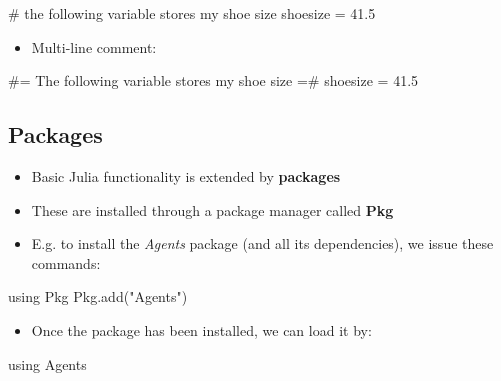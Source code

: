 \documentclass[
  letterpaper,
  DIV=11,
  numbers=noendperiod]{scrartcl}
\newenvironment{Shaded}{\begin{snugshade}}{\end{snugshade}}
\newcommand{\BuiltInTok}[1]{\textcolor[rgb]{0.00,0.23,0.31}{#1}}
\newcommand{\CommentTok}[1]{\textcolor[rgb]{0.37,0.37,0.37}{#1}}
\newcommand{\FloatTok}[1]{\textcolor[rgb]{0.68,0.00,0.00}{#1}}
\newcommand{\FunctionTok}[1]{\textcolor[rgb]{0.28,0.35,0.67}{#1}}
\newcommand{\ImportTok}[1]{\textcolor[rgb]{0.00,0.46,0.62}{#1}}
\newcommand{\NormalTok}[1]{\textcolor[rgb]{0.00,0.23,0.31}{#1}}
\newcommand{\OperatorTok}[1]{\textcolor[rgb]{0.37,0.37,0.37}{#1}}
\newcommand{\StringTok}[1]{\textcolor[rgb]{0.13,0.47,0.30}{#1}}
\providecommand{\tightlist}{%
  \setlength{\itemsep}{0pt}\setlength{\parskip}{0pt}}\usepackage{longtable,booktabs,array}
\begin{document}
\begin{Shaded}
\begin{Highlighting}[]
\CommentTok{\# the following variable stores my shoe size}
\NormalTok{shoesize }\OperatorTok{=} \FloatTok{41.5}
\end{Highlighting}
\end{Shaded}

\begin{itemize}
\tightlist
\item
  Multi-line comment:
\end{itemize}

\begin{Shaded}
\begin{Highlighting}[]
\CommentTok{\#=}
\CommentTok{The following variable}
\CommentTok{stores my shoe size}
\CommentTok{=\#}
\NormalTok{shoesize }\OperatorTok{=} \FloatTok{41.5}
\end{Highlighting}
\end{Shaded}

\subsection{Packages}\label{packages}

\begin{itemize}
\tightlist
\item
  Basic Julia functionality is extended by \textbf{packages}
\item
  These are installed through a package manager called \textbf{Pkg}
\item
  E.g. to install the \emph{Agents} package (and all its dependencies),
  we issue these commands:
\end{itemize}

\begin{Shaded}
\begin{Highlighting}[]
\ImportTok{using} \BuiltInTok{Pkg}
\BuiltInTok{Pkg}\NormalTok{.}\FunctionTok{add}\NormalTok{(}\StringTok{"Agents"}\NormalTok{)}
\end{Highlighting}
\end{Shaded}

\begin{itemize}
\tightlist
\item
  Once the package has been installed, we can load it by:
\end{itemize}

\begin{Shaded}
\begin{Highlighting}[]
\ImportTok{using} \BuiltInTok{Agents}
\end{Highlighting}
\end{Shaded}
\end{document}
